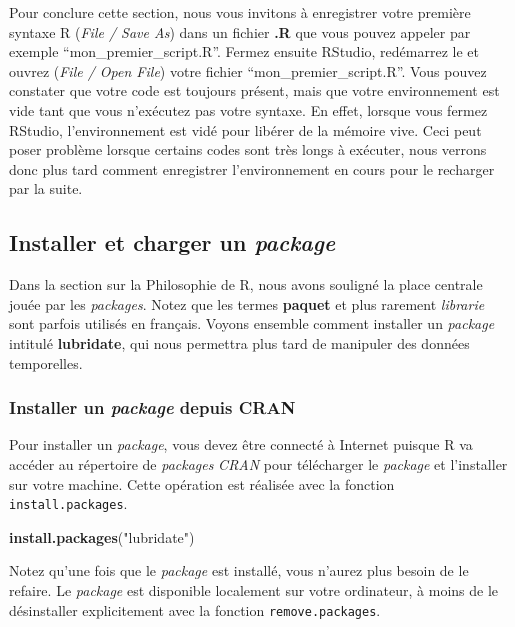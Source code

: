 \documentclass[
  11pt,
  french,
]{book}
\makeatletter
\newenvironment{Shaded}{\begin{snugshade}}{\end{snugshade}}
\newcommand{\KeywordTok}[1]{\textcolor[rgb]{0.13,0.29,0.53}{\textbf{#1}}}
\newcommand{\NormalTok}[1]{#1}
\newcommand{\StringTok}[1]{\textcolor[rgb]{0.31,0.60,0.02}{#1}}
\newenvironment{kframe}{%
\medskip{}
\setlength{\fboxsep}{.8em}
 \def\at@end@of@kframe{}%
 \ifinner\ifhmode%
  \def\at@end@of@kframe{\end{minipage}}%
  \begin{minipage}{\columnwidth}%
 \fi\fi%
 \def\FrameCommand##1{\hskip\@totalleftmargin \hskip-\fboxsep
 \colorbox{shadecolor}{##1}\hskip-\fboxsep
     \hskip-\linewidth \hskip-\@totalleftmargin \hskip\columnwidth}%
 \MakeFramed {\advance\hsize-\width
   \@totalleftmargin\z@ \linewidth\hsize
   \@setminipage}}%
 {\par\unskip\endMakeFramed%
 \at@end@of@kframe}
\renewenvironment{Shaded}{\begin{kframe}}{\end{kframe}}
\makeatother
\begin{document}
Pour conclure cette section, nous vous invitons à enregistrer votre première syntaxe R (\emph{File / Save As}) dans un fichier \textbf{.R} que vous pouvez appeler par exemple ``mon\_premier\_script.R''. Fermez ensuite RStudio, redémarrez le et ouvrez (\emph{File / Open File}) votre fichier ``mon\_premier\_script.R''. Vous pouvez constater que votre code est toujours présent, mais que votre environnement est vide tant que vous n'exécutez pas votre syntaxe. En effet, lorsque vous fermez RStudio, l'environnement est vidé pour libérer de la mémoire vive. Ceci peut poser problème lorsque certains codes sont très longs à exécuter, nous verrons donc plus tard comment enregistrer l'environnement en cours pour le recharger par la suite.

\hypertarget{sect0123}{%
\subsection{\texorpdfstring{Installer et charger un \emph{package}}{Installer et charger un package}}\label{sect0123}}

Dans la section sur la Philosophie de R, nous avons souligné la place centrale jouée par les \emph{packages}. Notez que les termes \textbf{paquet} et plus rarement \emph{librarie} sont parfois utilisés en français. Voyons ensemble comment installer un \emph{package} intitulé \textbf{lubridate}, qui nous permettra plus tard de manipuler des données temporelles.

\hypertarget{sect01231}{%
\subsubsection{\texorpdfstring{Installer un \emph{package} depuis CRAN}{Installer un package depuis CRAN}}\label{sect01231}}

Pour installer un \emph{package}, vous devez être connecté à Internet puisque R va accéder au répertoire de \emph{packages} \emph{CRAN} pour télécharger le \emph{package} et l'installer sur votre machine. Cette opération est réalisée avec la fonction \texttt{install.packages}.

\begin{Shaded}
\begin{Highlighting}[]
\KeywordTok{install.packages}\NormalTok{(}\StringTok{"lubridate"}\NormalTok{)}
\end{Highlighting}
\end{Shaded}

Notez qu'une fois que le \emph{package} est installé, vous n'aurez plus besoin de le refaire. Le \emph{package} est disponible localement sur votre ordinateur, à moins de le désinstaller explicitement avec la fonction \texttt{remove.packages}.
\end{document}
